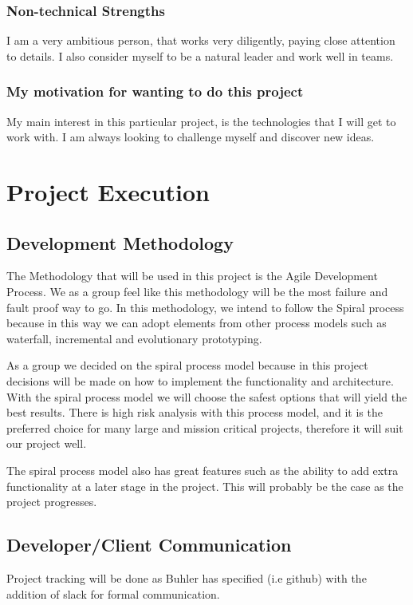 \documentclass[a4paper,12pt]{article}
\begin{document}
			\subsubsection{Non-technical Strengths}
			I am a very ambitious person, that works very diligently, paying close attention to details. I also consider myself to be a natural leader and work well in teams. 
			\subsubsection{My motivation for wanting to do this project}
			My main interest in this particular project, is the technologies that I will get to work with. I am always looking to challenge myself and discover new ideas.
	\newpage
	\section{Project Execution}
	
	\subsection{Development Methodology}  
	
	The Methodology that will be used in this project is the Agile Development Process. We as a group feel like this methodology will be the most failure and fault proof way to go. In this methodology, we intend to follow the Spiral process because in this way we can adopt elements from other process models such as waterfall, incremental and evolutionary prototyping.

	{\noindent}As a group we decided on the spiral process model because in this project decisions will be made on how to implement the functionality and architecture. With the spiral process model we will choose the safest options that will yield the best results. There is high risk analysis with this process model, and it is the preferred choice for many large and mission critical projects, therefore it will suit our project well.

	{\noindent}The spiral process model also has great features such as the ability to add extra functionality at a later stage in the project. This will probably be the case as the project progresses.

	
	\newpage
	\subsection{Developer/Client Communication}
		Project tracking will be done as Buhler has specified (i.e github) with the addition of slack for formal communication. 
	\newpage
\end{document}
